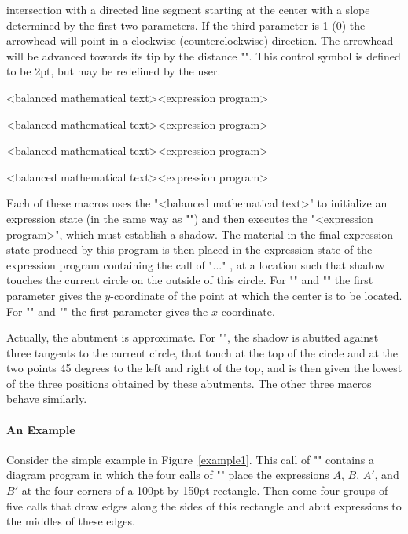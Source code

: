 \documentclass[11pt]{article}
\begin{document}
intersection with a directed line segment starting at the center with a
slope determined by the first two parameters.  If the third parameter
is 1 (0) the arrowhead will point in a clockwise (counterclockwise)
direction.  The arrowhead will be advanced towards its tip by the distance
"\circleheaddisp".  This control symbol is defined to be 2pt, but may be
redefined by the user.
\begin{myverb}
        {<balanced mathematical text>}{<expression program>}

        {<balanced mathematical text>}{<expression program>}

        {<balanced mathematical text>}{<expression program>}

        {<balanced mathematical text>}{<expression program>}
\end{myverb}
Each of these macros uses the "<balanced mathematical text>" to initialize
an expression state (in the same way as "\vertex") and then executes the
"<expression program>", which must establish a shadow.  The material in the
final expression state produced by this program is then placed in the
expression state of the expression program containing the call of
"\abutcircle..." , at a location such that shadow touches the current circle
on the outside of this circle.  For "\abutcircleleft" and "\abutcircleright"
the first parameter gives the $y$-coordinate of the point at which the center
is to be located.  For "\abutcirclebelow" and "\abutcircleabove" the first
parameter gives the $x$-coordinate.

Actually, the abutment is approximate.  For "\abutcircleabove", the shadow
is abutted against three tangents to the current circle, that touch at the
top of the circle and at the two points 45 degrees to the left and right
of the top, and is then given the lowest of the three positions obtained
by these abutments.  The other three macros behave similarly.

\paragraph{An Example}

Consider the simple example in Figure~\ref{example1}.
This call of "\diagram" contains a diagram program in which the four calls
of "\vertex" place the expressions $A$, $B$, $A'$, and $B'$ at the four corners of
a 100pt by 150pt rectangle.  Then come four groups of five calls that
draw edges along the sides of this rectangle and abut expressions to
the middles of these edges.
\end{document}
